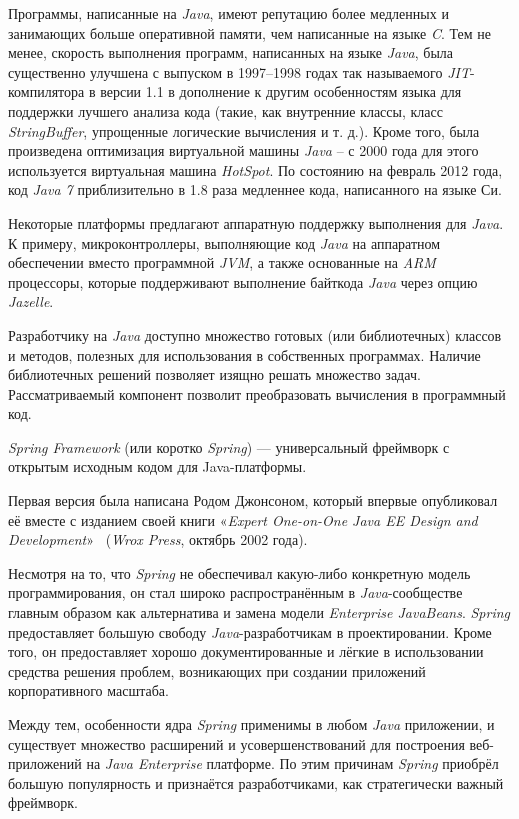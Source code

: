 Программы, написанные на \textit{Java}, имеют репутацию более медленных и занимающих больше оперативной памяти, чем написанные на языке \textit{C}. Тем не менее, скорость выполнения программ, написанных на языке \textit{Java}, была существенно улучшена с выпуском в 1997–1998 годах так называемого \textit{JIT}-компилятора в версии 1.1 в дополнение к другим особенностям языка для поддержки лучшего анализа кода (такие, как внутренние классы, класс \textit{StringBuffer}, упрощенные логические вычисления и т. д.). Кроме того, была произведена оптимизация виртуальной машины \textit{Java} – с 2000 года для этого используется виртуальная машина \textit{HotSpot}. По состоянию на февраль 2012 года, код \textit{Java 7} приблизительно в 1.8 раза медленнее кода, написанного на языке Си.

Некоторые платформы предлагают аппаратную поддержку выполнения для \textit{Java}. К примеру, микроконтроллеры, выполняющие код \textit{Java} на аппаратном обеспечении вместо программной \textit{JVM}, а также основанные на \textit{ARM} процессоры, которые поддерживают выполнение байткода \textit{Java} через опцию \textit{Jazelle}.

Разработчику на \textit{Java} доступно множество готовых (или библиотечных) классов и методов, полезных для использования в собственных программах. Наличие библиотечных решений позволяет изящно решать множество задач. Рассматриваемый компонент позволит преобразовать вычисления в программный код.

\textit{Spring Framework} (или коротко \textit{Spring}) — универсальный фреймворк с открытым исходным кодом для Java-платформы. 

Первая версия была написана Родом Джонсоном, который впервые опубликовал её вместе с изданием своей книги «\textit{Expert One-on-One Java EE Design and Development}»~\cite{spring} (\textit{Wrox Press}, октябрь 2002 года).

Несмотря на то, что \textit{Spring} не обеспечивал какую-либо конкретную модель программирования, он стал широко распространённым в \textit{Java}-сообществе главным образом как альтернатива и замена модели \textit{Enterprise JavaBeans}. \textit{Spring} предоставляет большую свободу \textit{Java}-разработчикам в проектировании. Кроме того, он предоставляет хорошо документированные и лёгкие в использовании средства решения проблем, возникающих при создании приложений корпоративного масштаба.

Между тем, особенности ядра \textit{Spring} применимы в любом \textit{Java} приложении, и существует множество расширений и усовершенствований для построения веб-приложений на \textit{Java Enterprise} платформе. По этим причинам \textit{Spring} приобрёл большую популярность и признаётся разработчиками, как стратегически важный фреймворк.

